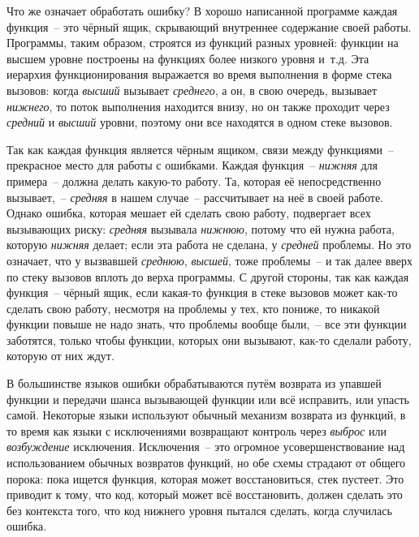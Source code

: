 Что же означает обработать ошибку? В хорошо написанной программе каждая функция~-- это
чёрный ящик, скрывающий внутреннее содержание своей работы. Программы, таким образом,
строятся из функций разных уровней: функции на высшем уровне построены на функциях более
низкого уровня и~т.д.  Эта иерархия функционирования выражается во время выполнения в
форме стека вызовов: когда \emph{высший} вызывает \emph{среднего}, а он, в свою очередь,
вызывает \emph{нижнего}, то поток выполнения находится внизу, но он также проходит через
\emph{средний} и \emph{высший} уровни, поэтому они все находятся в одном стеке вызовов.

Так как каждая функция является чёрным ящиком, связи между функциями~-- прекрасное место
для работы с ошибками. Каждая функция~-- \emph{нижняя} для примера~-- должна делать
какую-то работу. Та, которая её непосредственно вызывает,~-- \emph{средняя} в нашем
случае~-- рассчитывает на неё в своей работе. Однако ошибка, которая мешает ей сделать
свою работу, подвергает всех вызывающих риску: \emph{средняя} вызывала \emph{нижнюю},
потому что ей нужна работа, которую \emph{нижняя} делает; если эта работа не сделана, у
\emph{средней} проблемы. Но это означает, что у вызвавшей \emph{среднюю}, \emph{высшей},
тоже проблемы~-- и так далее вверх по стеку вызовов вплоть до верха программы. С другой
стороны, так как каждая функция~-- чёрный ящик, если какая-то функция в стеке вызовов
может как-то сделать свою работу, несмотря на проблемы у тех, кто пониже, то никакой
функции повыше не надо знать, что проблемы вообще были,~-- все эти функции заботятся,
только чтобы функции, которых они вызывают, как-то сделали работу, которую от них ждут.

В большинстве языков ошибки обрабатываются путём возврата из упавшей функции и передачи
шанса вызывающей функции или всё исправить, или упасть самой. Некоторые языки используют
обычный механизм возврата из функций, в то время как языки с исключениями возвращают
контроль через \textit{выброс} или \textit{возбуждение} исключения. Исключения~-- это
огромное усовершенствование над использованием обычных возвратов функций, но обе схемы
страдают от общего порока: пока ищется функция, которая может восстановиться, стек
пустеет. Это приводит к тому, что код, который может всё восстановить, должен сделать это
без контекста того, что код нижнего уровня пытался сделать, когда случилась ошибка.

